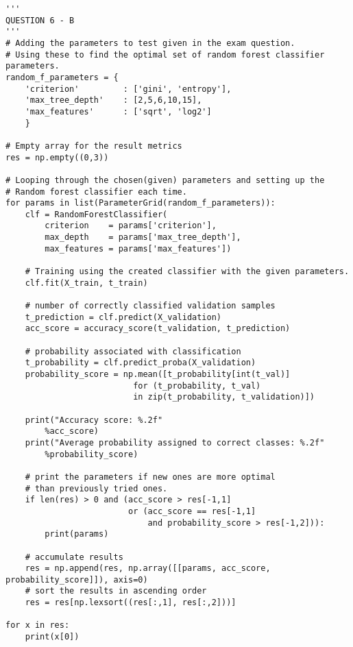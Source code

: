 \begin{verbatim}
'''
QUESTION 6 - B
'''
# Adding the parameters to test given in the exam question.
# Using these to find the optimal set of random forest classifier parameters.
random_f_parameters = {
    'criterion'         : ['gini', 'entropy'],
    'max_tree_depth'    : [2,5,6,10,15],
    'max_features'      : ['sqrt', 'log2']
    }

# Empty array for the result metrics
res = np.empty((0,3)) 

# Looping through the chosen(given) parameters and setting up the
# Random forest classifier each time.
for params in list(ParameterGrid(random_f_parameters)):
    clf = RandomForestClassifier(
        criterion    = params['criterion'],
        max_depth    = params['max_tree_depth'],
        max_features = params['max_features'])

    # Training using the created classifier with the given parameters.
    clf.fit(X_train, t_train)

    # number of correctly classified validation samples
    t_prediction = clf.predict(X_validation)
    acc_score = accuracy_score(t_validation, t_prediction)

    # probability associated with classification
    t_probability = clf.predict_proba(X_validation)
    probability_score = np.mean([t_probability[int(t_val)]
                          for (t_probability, t_val)
                          in zip(t_probability, t_validation)])

    print("Accuracy score: %.2f"
        %acc_score)
    print("Average probability assigned to correct classes: %.2f"
        %probability_score)

    # print the parameters if new ones are more optimal 
    # than previously tried ones.
    if len(res) > 0 and (acc_score > res[-1,1]
                         or (acc_score == res[-1,1]
                             and probability_score > res[-1,2])):
        print(params)

    # accumulate results
    res = np.append(res, np.array([[params, acc_score, probability_score]]), axis=0)
    # sort the results in ascending order
    res = res[np.lexsort((res[:,1], res[:,2]))] 

for x in res:
    print(x[0])

\end{verbatim}

\newpage
